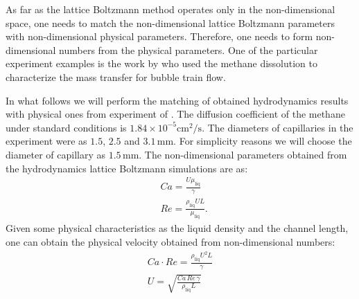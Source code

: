\documentclass{article}
\begin{document}
As far as the lattice Boltzmann method operates only in the non-dimensional space, one needs to
match the non-dimensional lattice Boltzmann parameters with non-dimensional physical parameters.
Therefore, one needs to form non-dimensional numbers from the physical parameters. One of the
particular experiment examples is the
work by \citet{bercic-mass} who used the methane dissolution to characterize the mass transfer for
bubble train flow. 

In what follows we will perform the matching of obtained hydrodynamics results
\cite{kuzmin-binary2d} with physical ones from experiment of \citet{bercic-mass}. The diffusion
coefficient of the methane under standard conditions \cite{methane-properties} is
$1.84\times 10^{-5} \mathrm{cm}^2/\mathrm{s}$. The diameters of capillaries in the experiment were
as $1.5$, $2.5$ and
$3.1\,\mathrm{mm}$. For simplicity reasons we will choose the diameter of capillary as $1.5\,
\mathrm{mm}$. 
The non-dimensional parameters obtained from the hydrodynamics lattice Boltzmann simulations are
as:
\begin{equation}
\begin{aligned}
&Ca=\frac{U \mu_{\mathrm{liq}}}{\gamma}\\
&Re=\frac{\rho_{\mathrm{liq}} U L}{\mu_{\mathrm{liq}}}.
\end{aligned}
\end{equation}
Given some physical characteristics as the liquid density and the channel length,
one can obtain the physical velocity obtained from non-dimensional numbers:
\begin{equation}
\begin{aligned}
Ca\cdot Re= \frac{\rho_{\mathrm{liq}} U^2 L}{\gamma}\\
U=\sqrt{\frac{Ca\,Re\,\gamma}{\rho_{\mathrm{liq}}L}}
\end{aligned}
\end{equation}
\end{document}

